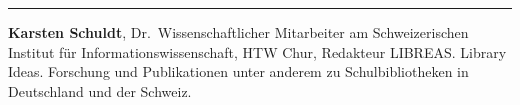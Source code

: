 \begin{center}\rule{0.5\linewidth}{\linethickness}\end{center}

\textbf{Karsten Schuldt}, Dr.~Wissenschaftlicher Mitarbeiter am
Schweizerischen Institut für Informationswissenschaft, HTW Chur,
Redakteur LIBREAS. Library Ideas. Forschung und Publikationen unter
anderem zu Schulbibliotheken in Deutschland und der Schweiz.

